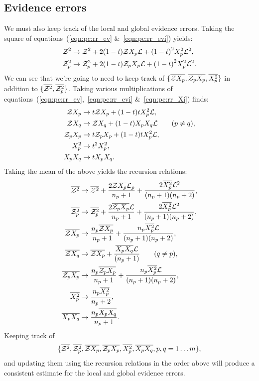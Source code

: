 \subsection{Evidence errors}
\label{sec:pc:cluster_err}

We must also keep track of the local and global evidence errors. Taking the square of equations~(\ref{eqn:pc:rr_ev} \&~\ref{eqn:pc:rr_evi}) yields:
%
\begin{align}
  \mathcal{Z}^2 &\to \mathcal{Z}^2 + 2 (1-t) \mathcal{Z} X_p \mathcal{L} +  {(1-t)}^2 X_p^2 \mathcal{L}^2, \\
  \mathcal{Z}_p^2 &\to \mathcal{Z}_p^2 + 2 (1-t) \mathcal{Z}_p X_p \mathcal{L} +  {(1-t)}^2 X_p^2 \mathcal{L}^2.
\end{align}
%
We can see that we're going to need to keep track of $\{\overline{\mathcal{Z} X_p}, \overline{\mathcal{Z}_p X_p}, \overline{X_p^2}\}$ in addition to $\{ \overline{\mathcal{Z}^2}, \overline{\mathcal{Z}_p^2} \}$. Taking various multiplications of equations~(\ref{eqn:pc:rr_ev},~\ref{eqn:pc:rr_evi} \&~\ref{eqn:pc:rr_Xi}) finds:
%
\begin{align}
  \mathcal{Z} X_p   &\to t \mathcal{Z} X_p + (1-t)t X_p^2 \mathcal{L}, \\
  \mathcal{Z} X_q   &\to   \mathcal{Z} X_q + (1-t) X_p X_q \mathcal{L} \qquad (p\ne q),   \\
  \mathcal{Z}_p X_p &\to t \mathcal{Z}_p X_p + (1-t)t X_p^2 \mathcal{L}, \\
  X_p^2     &\to t^2 X_p^2, \\
  X_p X_q   &\to t   X_p X_q.
\end{align}
%
Taking the mean of the above yields the recursion relations:
\begin{align}
  \overline{\mathcal{Z}^2} &\to \overline{\mathcal{Z}^2} + \frac{2\overline{\mathcal{Z} X_p}\mathcal{L}_p}{n_p+1}  + \frac{2\overline{X_p^2}\mathcal{L}^2}{(n_p+1)(n_p+2)}, \\
  \overline{\mathcal{Z}_p^2} &\to \overline{\mathcal{Z}_p^2} + \frac{2\overline{\mathcal{Z}_p X_p}\mathcal{L}}{n_p+1}  + \frac{2\overline{X_p^2}\mathcal{L}^2}{(n_p+1)(n_p+2)}, \\
  \overline{\mathcal{Z} X_p} &\to \frac{n_p\overline{\mathcal{Z} X_p}}{n_p+1}  + \frac{n_p\overline{X_p^2} \mathcal{L}}{(n_p+1)(n_p+2)},   \\
  \overline{\mathcal{Z} X_q} &\to \overline{\mathcal{Z} X_p}  + \frac{\overline{X_p X_q} \mathcal{L}}{(n_p+1)} \qquad (q\ne p),  \\
  \overline{\mathcal{Z}_p X_p} &\to \frac{n_p\overline{\mathcal{Z}_p X_p}}{n_p+1}  + \frac{n_p\overline{X_p^2} \mathcal{L}}{(n_p+1)(n_p+2)},   \\
  \overline{X_p^2} &\to \frac{n_p\overline{X_p^2}}{n_p+2}, \\
  \overline{X_p X_q} &\to \frac{n_p\overline{X_p X_q}}{n_p+1}.
\end{align}
Keeping track of 
\[\{\overline{\mathcal{Z}^2},\overline{\mathcal{Z}_p^2},\overline{\mathcal{Z} X_p},\overline{\mathcal{Z}_p X_p},\overline{X_p^2},\overline{X_p X_q},p,q=1\ldots m\},\]
and updating them using the recursion relations in the order above will produce a consistent estimate for the local and global evidence errors.



